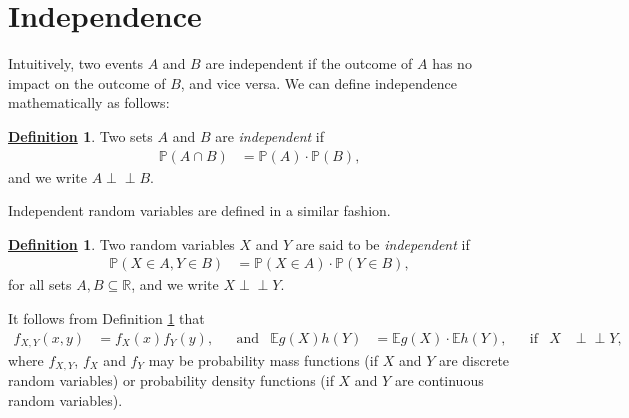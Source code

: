 \documentclass[12pt]{book}
\numberwithin{equation}{chapter}
\theoremstyle{plain}
\numberwithin{theorem}{section}
\theoremstyle{definition}
\newtheorem{definition}[theorem]{\underline{Definition}}
\numberwithin{exercise}{chapter}
\newcommand{\<}{\langle}
\renewcommand{\>}{\rangle}
\renewcommand{\(}{\left(}
\renewcommand{\)}{\right)}
\renewcommand{\[}{\left[}
\renewcommand{\]}{\right]}
\newcommand\Eb{\mathds{E}}
\newcommand\Pb{\mathds{P}}
\newcommand\Rb{\mathds{R}}
\newcommand{\ind}{\perp \! \! \! \perp}
\theoremstyle{definition}
\numberwithin{question}{section}
\begin{document}
\section{Independence}
\label{sec:independence}
Intuitively, two events $A$ and $B$ are independent if the outcome of $A$ has no impact on the outcome of $B$, and vice versa.  We can define independence mathematically as follows:

\begin{definition}
\label{def:ind.sets}
Two sets $A$ and $B$ are \textit{independent} if
\begin{align}
\Pb(A \cap B)
	&=	\Pb(A) \cdot \Pb(B) ,
\end{align}
and we write $A \ind B$.
\end{definition}

\noindent
Independent random variables are defined in a similar fashion.

\begin{definition}
\label{def:ind.rvs}
Two random variables $X$ and $Y$ are said to be \textit{independent} if
\begin{align}
\Pb( X \in A, Y \in B )
	&=	\Pb(X \in A) \cdot \Pb( Y \in B ) ,
\end{align}
for all sets $A,B \subseteq \Rb$, and we write $X \ind Y$.
\end{definition}

\noindent
It follows from Definition \ref{def:ind.rvs} that
\begin{align}
f_{X,Y}(x,y)
	&=	f_X(x) f_Y(y) , &
	&\text{and}&
\Eb g(X) h(Y) 
	&=	\Eb g(X) \cdot \Eb h(Y) , &
	&\text{if} &
X 
	&\ind Y ,
\end{align}
where $f_{X,Y}$, $f_X$ and $f_Y$ may be probability mass functions (if $X$ and $Y$ are discrete random variables) or probability density functions (if $X$ and $Y$ are continuous random variables).

\end{document}
